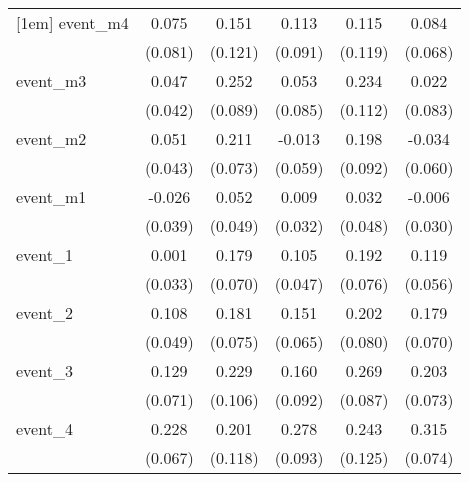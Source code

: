 {\begin{tabular}{l*{5}{c}}
[1em]
event\_m4    &       0.075         &       0.151         &       0.113         &       0.115         &       0.084         \\
            &     (0.081)         &     (0.121)         &     (0.091)         &     (0.119)         &     (0.068)         \\
[1em]
event\_m3    &       0.047         &       0.252\sym{**} &       0.053         &       0.234\sym{*}  &       0.022         \\
            &     (0.042)         &     (0.089)         &     (0.085)         &     (0.112)         &     (0.083)         \\
[1em]
event\_m2    &       0.051         &       0.211\sym{**} &      -0.013         &       0.198\sym{*}  &      -0.034         \\
            &     (0.043)         &     (0.073)         &     (0.059)         &     (0.092)         &     (0.060)         \\
[1em]
event\_m1    &      -0.026         &       0.052         &       0.009         &       0.032         &      -0.006         \\
            &     (0.039)         &     (0.049)         &     (0.032)         &     (0.048)         &     (0.030)         \\
[1em]
event\_1     &       0.001         &       0.179\sym{*}  &       0.105\sym{*}  &       0.192\sym{*}  &       0.119\sym{*}  \\
            &     (0.033)         &     (0.070)         &     (0.047)         &     (0.076)         &     (0.056)         \\
[1em]
event\_2     &       0.108\sym{*}  &       0.181\sym{*}  &       0.151\sym{*}  &       0.202\sym{*}  &       0.179\sym{*}  \\
            &     (0.049)         &     (0.075)         &     (0.065)         &     (0.080)         &     (0.070)         \\
[1em]
event\_3     &       0.129         &       0.229\sym{*}  &       0.160         &       0.269\sym{**} &       0.203\sym{**} \\
            &     (0.071)         &     (0.106)         &     (0.092)         &     (0.087)         &     (0.073)         \\
[1em]
event\_4     &       0.228\sym{***}&       0.201         &       0.278\sym{**} &       0.243         &       0.315\sym{***}\\
            &     (0.067)         &     (0.118)         &     (0.093)         &     (0.125)         &     (0.074)         \\

\end{tabular}}
